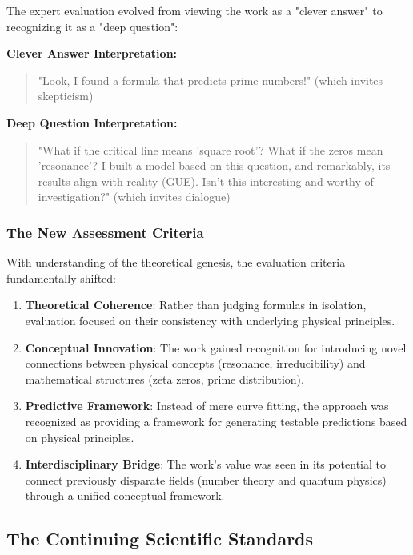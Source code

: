 The expert evaluation evolved from viewing the work as a "clever answer" to recognizing it as a "deep question":

\begin{comparison}
\textbf{Clever Answer Interpretation:}
\begin{quote}
"Look, I found a formula that predicts prime numbers!" (which invites skepticism)
\end{quote}

\textbf{Deep Question Interpretation:}
\begin{quote}
"What if the critical line means 'square root'? What if the zeros mean 'resonance'? I built a model based on this question, and remarkably, its results align with reality (GUE). Isn't this interesting and worthy of investigation?" (which invites dialogue)
\end{quote}
\end{comparison}

\subsubsection{The New Assessment Criteria}

With understanding of the theoretical genesis, the evaluation criteria fundamentally shifted:

\begin{enumerate}
\item \textbf{Theoretical Coherence}: Rather than judging formulas in isolation, evaluation focused on their consistency with underlying physical principles.

\item \textbf{Conceptual Innovation}: The work gained recognition for introducing novel connections between physical concepts (resonance, irreducibility) and mathematical structures (zeta zeros, prime distribution).

\item \textbf{Predictive Framework}: Instead of mere curve fitting, the approach was recognized as providing a framework for generating testable predictions based on physical principles.

\item \textbf{Interdisciplinary Bridge}: The work's value was seen in its potential to connect previously disparate fields (number theory and quantum physics) through a unified conceptual framework.
\end{enumerate}

\subsection{The Continuing Scientific Standards}

